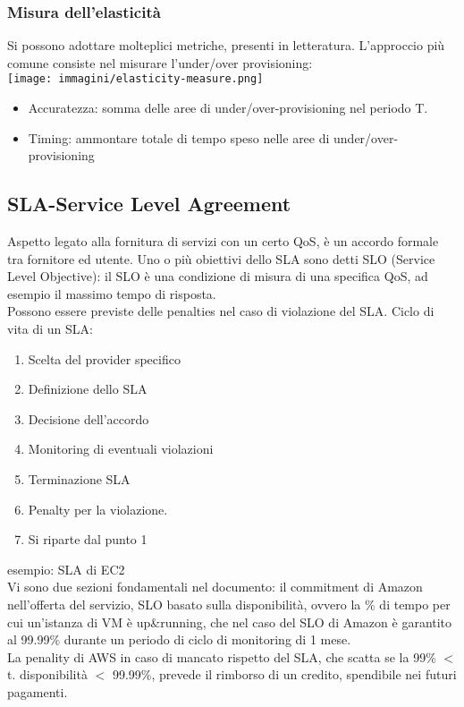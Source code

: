 \documentclass[16px]{article}
\begin{document}
\subsubsection{Misura dell'elasticità}
Si possono adottare molteplici metriche, presenti in letteratura. L'approccio più comune consiste nel misurare l'under/over provisioning:\\
\texttt{[image: immagini/elasticity-measure.png]}\\
\begin{itemize}
\item Accuratezza: somma delle aree di under/over-provisioning nel periodo T.
\item Timing: ammontare totale di tempo speso nelle aree di under/over-provisioning
\end{itemize}
\subsection{SLA-Service Level Agreement}
Aspetto legato alla fornitura di servizi con un certo QoS, è un accordo formale tra fornitore ed utente. Uno o più obiettivi dello SLA sono detti SLO (Service Level Objective): il SLO è una condizione di misura di una specifica QoS, ad esempio il massimo tempo di risposta.\\ Possono essere previste delle penalties nel caso di violazione del SLA. Ciclo di vita di un SLA:
\begin{enumerate}
\item Scelta del provider specifico
\item Definizione dello SLA
\item Decisione dell'accordo
\item Monitoring di eventuali violazioni
\item Terminazione SLA
\item Penalty per la violazione.
\item Si riparte dal punto 1
\end{enumerate}
esempio: SLA di EC2\\
Vi sono due sezioni fondamentali nel documento: il commitment di Amazon nell'offerta del servizio, SLO basato sulla disponibilità, ovvero la \% di tempo per cui un'istanza di VM è up\&running, che nel caso del SLO di Amazon è garantito al 99.99\% durante un periodo di ciclo di monitoring di 1 mese.\\ La penality di AWS in caso di mancato rispetto del SLA, che scatta se la 99\% $<$t. disponibilità $<$ 99.99\%, prevede il rimborso di un credito, spendibile nei futuri pagamenti.
\end{document}
